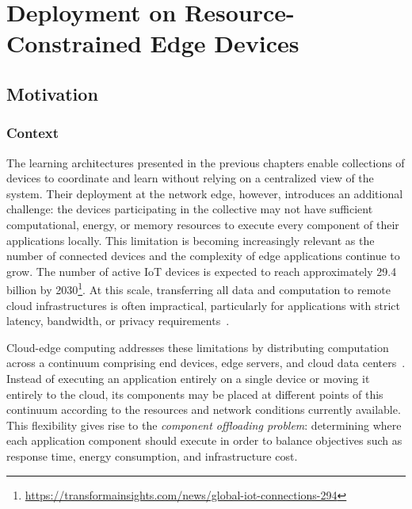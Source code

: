 
\chapter{Deployment on Resource-Constrained Edge Devices}
\label{chap:tasksplacement}
\minitoc


\section{Motivation}\label{sec:motivation}

\subsection{Context}
The learning architectures presented in the previous chapters 
 enable collections of devices to coordinate 
 and learn without relying on a centralized view of the system.
%
Their deployment at the network edge, however, 
 introduces an additional challenge:
 the devices participating in the collective may not have sufficient computational, 
 energy, or memory resources to execute every component of their applications locally.
%
This limitation is becoming increasingly relevant as the number of connected devices 
 and the complexity of edge applications continue to grow.
%
The number of active IoT devices is expected to reach approximately 29.4 billion 
 by 2030\footnote{\url{https://transformainsights.com/news/global-iot-connections-294}}.
%
At this scale, 
 transferring all data and computation to remote cloud infrastructures is often impractical, 
 particularly for applications with strict latency, bandwidth, 
 or privacy requirements~\cite{DBLP:journals/computer/Satyanarayanan17}.

Cloud-edge computing addresses these limitations 
 by distributing computation across a continuum comprising end devices, edge servers, 
 and cloud data centers~\cite{DBLP:journals/jpdc/RosendoCVA22}.
%
Instead of executing an application entirely on a single device or moving it entirely to the cloud,
 its components may be placed at different points of this continuum according to the resources 
 and network conditions currently available.
%
This flexibility gives rise to the \emph{component offloading problem}: 
 determining where each application component should execute in order to balance objectives such as response time, 
 energy consumption, and infrastructure cost.

